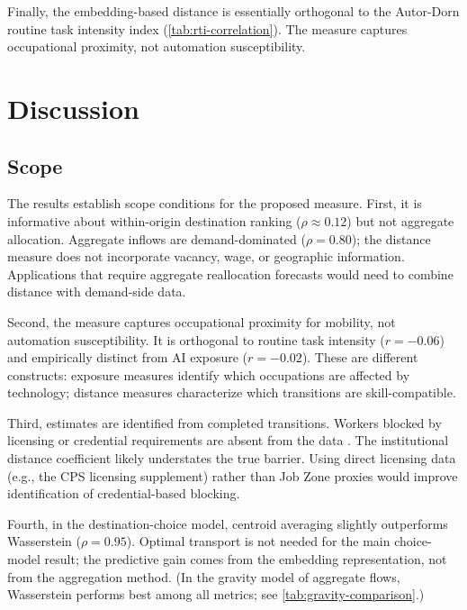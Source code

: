 \documentclass[12pt]{article}
\begin{document}
Finally, the embedding-based distance is essentially orthogonal to the Autor-Dorn routine task intensity index (\cref{tab:rti-correlation}). The measure captures occupational proximity, not automation susceptibility.


\section{Discussion}
\label{sec:discussion}


\subsection{Scope}

The results establish scope conditions for the proposed measure. First, it is informative about within-origin destination ranking ($\rho \approx 0.12$) but not aggregate allocation. Aggregate inflows are demand-dominated ($\rho = 0.80$); the distance measure does not incorporate vacancy, wage, or geographic information. Applications that require aggregate reallocation forecasts would need to combine distance with demand-side data.

Second, the measure captures occupational proximity for mobility, not automation susceptibility. It is orthogonal to routine task intensity ($r = -0.06$) and empirically distinct from AI exposure ($r = -0.02$). These are different constructs: exposure measures identify which occupations are affected by technology; distance measures characterize which transitions are skill-compatible.

Third, estimates are identified from completed transitions. Workers blocked by licensing or credential requirements are absent from the data \citep{Jackson2023,Heckman1979}. The institutional distance coefficient likely understates the true barrier. Using direct licensing data (e.g., the CPS licensing supplement) rather than Job Zone proxies would improve identification of credential-based blocking.

Fourth, in the destination-choice model, centroid averaging slightly outperforms Wasserstein ($\rho = 0.95$). Optimal transport is not needed for the main choice-model result; the predictive gain comes from the embedding representation, not from the aggregation method. (In the gravity model of aggregate flows, Wasserstein performs best among all metrics; see \cref{tab:gravity-comparison}.)
\end{document}
